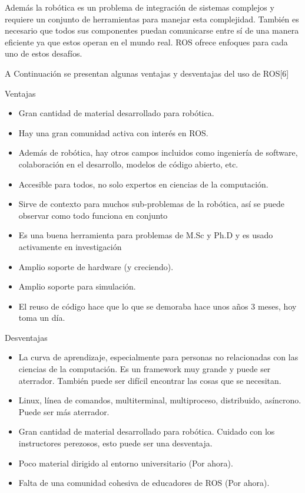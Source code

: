 Además la robótica es un problema de integración de sistemas complejos y requiere un conjunto de herramientas para manejar esta complejidad. También es necesario que todos sus componentes puedan comunicarse entre sí de una manera eficiente ya que estos operan en el mundo real. ROS ofrece enfoques para cada uno de estos desafíos.

A Continuación se presentan algunas ventajas y desventajas del uso de ROS[6]
\begin{description}

\item{Ventajas} \hfill \\
\begin{itemize}

\item Gran cantidad de material desarrollado para robótica.
\item Hay una gran comunidad activa con interés en ROS.
\item Además de robótica, hay otros campos incluidos como ingeniería de software, colaboración en el desarrollo, modelos de código abierto, etc.
\item Accesible para todos, no solo expertos en ciencias de la computación.
\item Sirve de contexto para muchos sub-problemas de la robótica, así se puede observar como todo funciona en conjunto
\item Es una buena herramienta para problemas de M.Sc y Ph.D y es usado activamente en investigación
\item Amplio soporte de hardware (y creciendo).
\item Amplio soporte para simulación.
\item El reuso de código hace que lo que se demoraba hace unos años 3 meses, hoy toma un día.

\end{itemize}

\item{Desventajas} \hfill \\

\begin{itemize}

\item La curva de aprendizaje, especialmente para personas no relacionadas con las ciencias de la computación. Es un framework muy grande y puede ser aterrador. También puede ser difícil encontrar las cosas que se necesitan.
\item Linux, línea de comandos, multiterminal, multiproceso, distribuido, asíncrono. Puede ser más aterrador.
\item Gran cantidad de material desarrollado para robótica. Cuidado con los instructores perezosos, esto puede ser una desventaja.
\item Poco material dirigido al entorno universitario (Por ahora).
\item Falta de una comunidad cohesiva de educadores de ROS (Por ahora).

\end{itemize}
\end{description}

